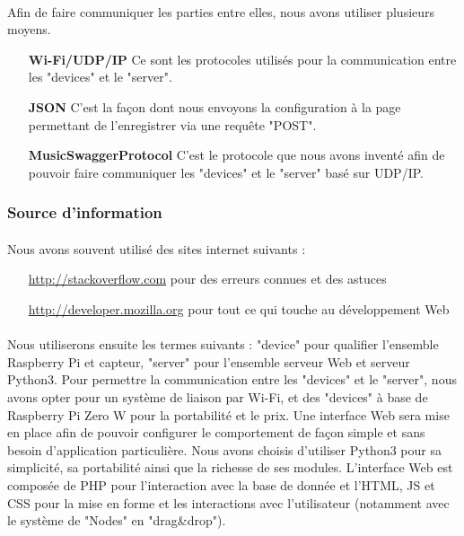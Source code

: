 \documentclass[12pt]{article}
\begin{document}
	\paragraph{}
	Afin de faire communiquer les parties entre elles, nous avons utiliser plusieurs moyens.\\
	
	\begin{itemize}
		\item[\textbf{Wi-Fi/UDP/IP}] Ce sont les protocoles utilisés pour la communication entre les "devices" et le "server".
		\item[\textbf{JSON}] C'est la façon dont nous envoyons la configuration à la page permettant de l'enregistrer via une requête "POST".
		\item[\textbf{MusicSwaggerProtocol}] C'est le protocole que nous avons inventé afin de pouvoir faire communiquer les "devices" et le "server" basé sur UDP/IP.
	\end{itemize}
	\subsubsection{Source d'information}
	\paragraph{}
	Nous avons souvent utilisé des sites internet suivants :
	\begin{itemize}
		\item[\url{http://stackoverflow.com}] pour des erreurs connues et des astuces
		\item[\url{http://developer.mozilla.org}] pour tout ce qui touche au développement Web
	\end{itemize}

	\paragraph{}
	Nous utiliserons ensuite les termes suivants : "device" pour qualifier l'ensemble Raspberry Pi et capteur, "server" pour l'ensemble serveur Web et serveur Python3.
	Pour permettre la communication entre les "devices" et le "server", nous avons opter pour un système de liaison par Wi-Fi, et des "devices" à base de Raspberry Pi Zero W pour la portabilité et le prix. Une interface Web sera mise en place afin de pouvoir configurer le comportement de façon simple et sans besoin d'application particulière. Nous avons choisis d'utiliser Python3 pour sa simplicité, sa portabilité ainsi que la richesse de ses modules. L'interface Web est composée de PHP pour l'interaction avec la base de donnée et l'HTML, JS et CSS pour la mise en forme et les interactions avec l'utilisateur (notamment avec le système de "Nodes" en "drag\&drop").
\end{document}
